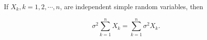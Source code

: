 If $X_k, k = 1, 2, \cdots, n$, are independent simple random variables, then

$$\sigma^2 \sum_{k=1}^{n} X_k = \sum_{k=1}^{n} \sigma^2 X_k.$$

